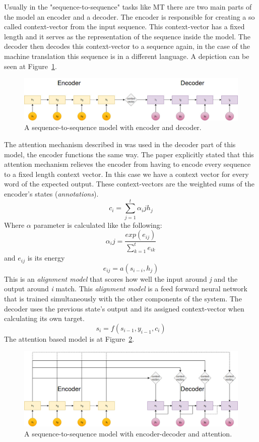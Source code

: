 Usually in the "sequence-to-sequence" tasks like MT there are two main parts of the model an encoder and a decoder. The encoder is responsible for creating a so called context-vector from the input sequence. This context-vector has a fixed length and it serves as the representation of the sequence inside the model. The decoder then decodes this context-vector to a sequence again, in the case of the machine translation this sequence is in a different language. A depiction can be seen at Figure~\ref{fig:seq_to_seq}.
\begin{figure}[!htb]
	\centering
	\includegraphics[scale=0.4]{seq_to_seq.jpg}
	\caption{A sequence-to-sequence model with encoder and decoder.}
	\label{fig:seq_to_seq}
\end{figure}

The attention mechanism described in \cite{Bahdanau:2015} was used in the decoder part of this model, the encoder functions the same way. The paper explicitly stated that this attention mechanism relieves the encoder from having to encode every sequence to a fixed length context vector. In this case we have a context vector for every word of the expected output. These context-vectors are the weighted sums of the encoder's states (\textit{annotations}).
\[c_i = \sum_{j=1}^{t} \alpha_ij h_j\]
Where \(\alpha\) parameter is calculated like the following:
\[\alpha_ij = \frac{exp(e_{ij})}{\sum_{k=1}^{t} e_{ik}} \]
and \(e_{ij}\) is its energy
\[e_{ij} = a(s_{i-i}, h_j)\]
This is an \textit{alignment model} that scores how well the input around \textit{j} and the output around \textit{i} match. This \textit{alignment model} is a feed forward neural network that is trained simultaneously with the other components of the system.
The decoder uses the previous state's output and its assigned context-vector when calculating its own target.
\[s_i = f(s_{i-1}, y_{i-1}, c_i)\]
The attention based model is at Figure~\ref{fig:attention}.
\begin{figure}[!htb]
	\centering
	\includegraphics[scale=0.4]{attention.jpg}
	\caption{A sequence-to-sequence model with encoder-decoder and attention.}
	\label{fig:attention}
\end{figure}

